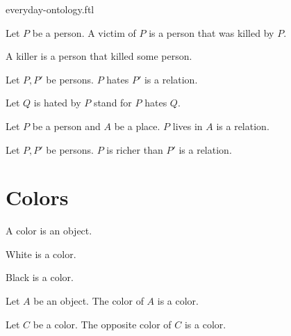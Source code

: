 \documentclass{stex}
\begin{document}
\begin{smodule}{everyday-ontology.ftl}
\begin{forthel}
    \begin{definition*}
      Let $P$ be a person.
      A victim of $P$ is a person that was killed by $P$.
    \end{definition*}

    \begin{definition*}
      A killer is a person that killed some person.
    \end{definition*}

    \begin{signature*}
      Let $P, P'$ be persons.
      $P$ hates $P'$ is a relation.
    \end{signature*}

    Let $Q$ is hated by $P$ stand for $P$ hates $Q$.

    \begin{signature*}
      Let $P$ be a person and $A$ be a place.
      $P$ lives in $A$ is a relation.
    \end{signature*}

    \begin{signature*}
      Let $P, P'$ be persons.
      $P$ is richer than $P'$ is a relation.
    \end{signature*}
  \end{forthel}


  \section*{Colors}

  \begin{forthel}
    \begin{signature*}
      A color is an object.
    \end{signature*}

    \begin{signature*}
      White is a color.
    \end{signature*}

    \begin{signature*}
      Black is a color.
    \end{signature*}

    \begin{signature*}
      Let $A$ be an object.
      The color of $A$ is a color.
    \end{signature*}

    \begin{signature*}
      Let $C$ be a color.
      The opposite color of $C$ is a color.
    \end{signature*}
  \end{forthel}



\end{smodule}
\end{document}
